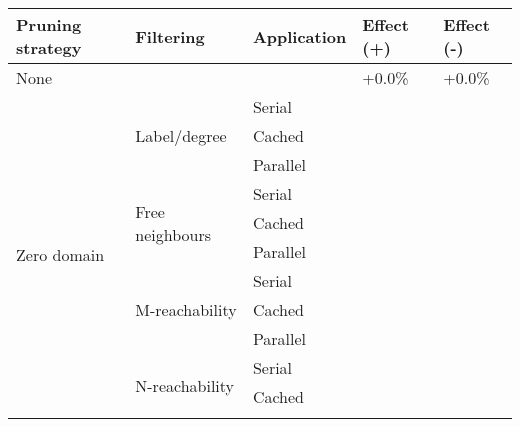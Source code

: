 \begin{table}[]
\begin{tabular}{|l|l|l|l|l|}
\hline
\textbf{Pruning strategy}      & \textbf{Filtering}               & \textbf{Application} & \textbf{Effect (+)} & \textbf{Effect (-)} \\ \hline
None                           &                                  &                      & +0.0\%              & +0.0\%              \\ \hline
\multirow{12}{*}{Zero domain}  & \multirow{3}{*}{Label/degree}    & Serial               &                     &                     \\ \cline{3-5} 
                               &                                  & Cached               &                     &                     \\ \cline{3-5} 
                               &                                  & Parallel             &                     &                     \\ \cline{2-5} 
                               & \multirow{3}{*}{Free neighbours} & Serial               &                     &                     \\ \cline{3-5} 
                               &                                  & Cached               &                     &                     \\ \cline{3-5} 
                               &                                  & Parallel             &                     &                     \\ \cline{2-5} 
                               & \multirow{3}{*}{M-reachability}  & Serial               &                     &                     \\ \cline{3-5} 
                               &                                  & Cached               &                     &                     \\ \cline{3-5} 
                               &                                  & Parallel             &                     &                     \\ \cline{2-5} 
                               & \multirow{3}{*}{N-reachability}  & Serial               &                     &                     \\ \cline{3-5} 
                               &                                  & Cached               &                     &                     \\ \cline{3-5} 

\end{tabular}
\end{table}
